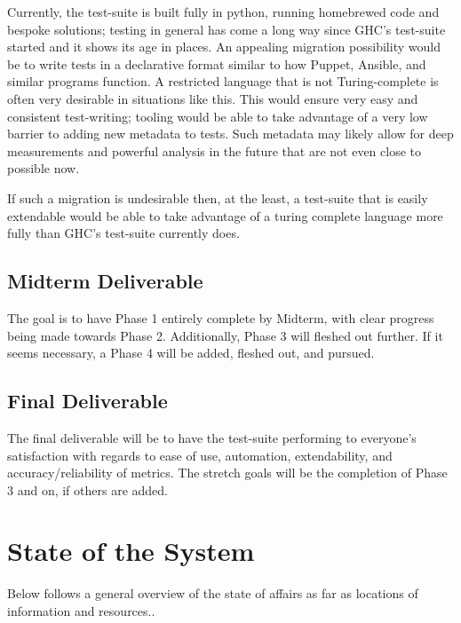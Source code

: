 \documentclass{article}
\begin{document}
\begin{enumerate}
  Currently, the test-suite is built fully in python, running homebrewed code and bespoke solutions; testing in general has come a long way since GHC's test-suite started and it shows its age in places.
  An appealing migration possibility would be to write tests in a declarative format similar to how Puppet, Ansible, and similar programs function.
  A restricted language that is not Turing-complete is often very desirable in situations like this.
  This would ensure very easy and consistent test-writing; tooling would be able to take advantage of a very low barrier to adding new metadata to tests.
  Such metadata may likely allow for deep measurements and powerful analysis in the future that are not even close to possible now.

  If such a migration is undesirable then, at the least, a test-suite that is easily extendable would be able to take advantage of a turing complete language more fully than GHC's test-suite currently does.
\end{enumerate}

\subsection*{Midterm Deliverable}
The goal is to have Phase 1 entirely complete by Midterm, with clear progress being made towards Phase 2.
Additionally, Phase 3 will fleshed out further.
If it seems necessary, a Phase 4 will be added, fleshed out, and pursued.
\subsection*{Final Deliverable}
The final deliverable will be to have the test-suite performing to everyone's satisfaction with regards to ease of use, automation, extendability, and accuracy/reliability of metrics.
The stretch goals will be the completion of Phase 3 and on, if others are added.

\section*{State of the System}
Below follows a general overview of the state of affairs as far as locations of information and resources..
\end{document}
